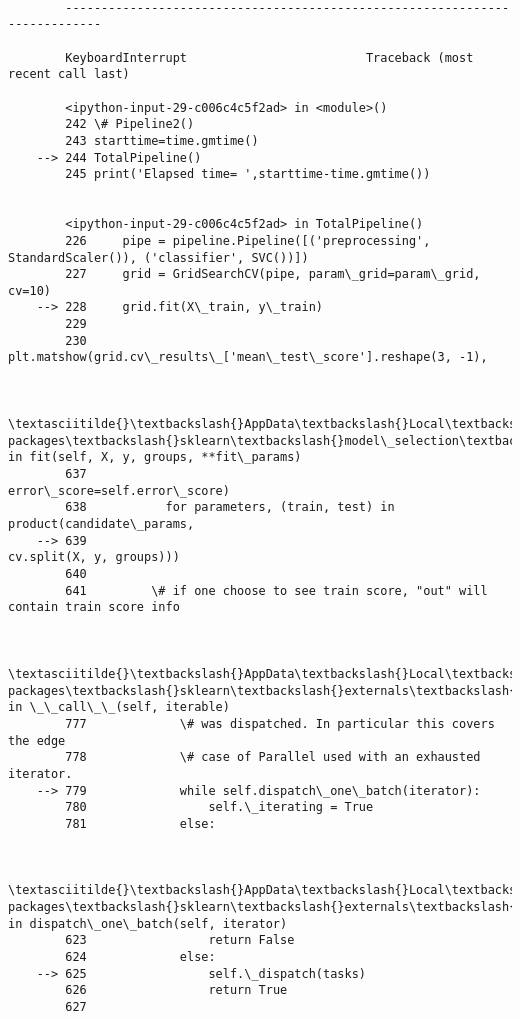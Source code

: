 \documentclass[11pt]{article}
\begin{document}
    \begin{Verbatim}[commandchars=\\\{\}]

        ---------------------------------------------------------------------------

        KeyboardInterrupt                         Traceback (most recent call last)

        <ipython-input-29-c006c4c5f2ad> in <module>()
        242 \# Pipeline2()
        243 starttime=time.gmtime()
    --> 244 TotalPipeline()
        245 print('Elapsed time= ',starttime-time.gmtime())
    

        <ipython-input-29-c006c4c5f2ad> in TotalPipeline()
        226     pipe = pipeline.Pipeline([('preprocessing', StandardScaler()), ('classifier', SVC())])
        227     grid = GridSearchCV(pipe, param\_grid=param\_grid, cv=10)
    --> 228     grid.fit(X\_train, y\_train)
        229 
        230     plt.matshow(grid.cv\_results\_['mean\_test\_score'].reshape(3, -1),
    

        \textasciitilde{}\textbackslash{}AppData\textbackslash{}Local\textbackslash{}Continuum\textbackslash{}anaconda3\textbackslash{}lib\textbackslash{}site-packages\textbackslash{}sklearn\textbackslash{}model\_selection\textbackslash{}\_search.py in fit(self, X, y, groups, **fit\_params)
        637                                   error\_score=self.error\_score)
        638           for parameters, (train, test) in product(candidate\_params,
    --> 639                                                    cv.split(X, y, groups)))
        640 
        641         \# if one choose to see train score, "out" will contain train score info
    

        \textasciitilde{}\textbackslash{}AppData\textbackslash{}Local\textbackslash{}Continuum\textbackslash{}anaconda3\textbackslash{}lib\textbackslash{}site-packages\textbackslash{}sklearn\textbackslash{}externals\textbackslash{}joblib\textbackslash{}parallel.py in \_\_call\_\_(self, iterable)
        777             \# was dispatched. In particular this covers the edge
        778             \# case of Parallel used with an exhausted iterator.
    --> 779             while self.dispatch\_one\_batch(iterator):
        780                 self.\_iterating = True
        781             else:
    

        \textasciitilde{}\textbackslash{}AppData\textbackslash{}Local\textbackslash{}Continuum\textbackslash{}anaconda3\textbackslash{}lib\textbackslash{}site-packages\textbackslash{}sklearn\textbackslash{}externals\textbackslash{}joblib\textbackslash{}parallel.py in dispatch\_one\_batch(self, iterator)
        623                 return False
        624             else:
    --> 625                 self.\_dispatch(tasks)
        626                 return True
        627 
    


\end{Verbatim}
\end{document}
